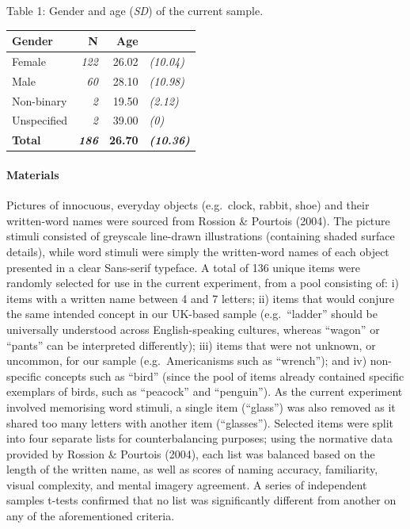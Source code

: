 \documentclass[
  11pt,
]{article}
\begin{document}
Table 1: Gender and age (\emph{SD}) of the current sample.

\begin{table}[!h]
\centering
\begin{tabular}{l>{}rr>{}l}
\toprule
Gender & N & Age & \\
\midrule
Female & \em{122} & 26.02 & \em{(10.04)}\\
Male & \em{60} & 28.10 & \em{(10.98)}\\
Non-binary & \em{2} & 19.50 & \em{(2.12)}\\
Unspecified & \em{2} & 39.00 & \em{(0)}\\
\textbf{Total} & \textbf{\em{186}} & \textbf{26.70} & \textbf{\em{(10.36)}}\\
\bottomrule
\end{tabular}
\end{table}

\hypertarget{materials}{%
\paragraph{Materials}\label{materials}}

Pictures of innocuous, everyday objects (e.g.~clock, rabbit, shoe) and
their written-word names were sourced from Rossion \& Pourtois (2004).
The picture stimuli consisted of greyscale line-drawn illustrations
(containing shaded surface details), while word stimuli were simply the
written-word names of each object presented in a clear Sans-serif
typeface. A total of 136 unique items were randomly selected for use in
the current experiment, from a pool consisting of: i) items with a
written name between 4 and 7 letters; ii) items that would conjure the
same intended concept in our UK-based sample (e.g.~``ladder'' should be
universally understood across English-speaking cultures, whereas
``wagon'' or ``pants'' can be interpreted differently); iii) items that
were not unknown, or uncommon, for our sample (e.g.~Americanisms such as
``wrench''); and iv) non-specific concepts such as ``bird'' (since the
pool of items already contained specific exemplars of birds, such as
``peacock'' and ``penguin''). As the current experiment involved
memorising word stimuli, a single item (``glass'') was also removed as
it shared too many letters with another item (``glasses''). Selected
items were split into four separate lists for counterbalancing purposes;
using the normative data provided by Rossion \& Pourtois (2004), each
list was balanced based on the length of the written name, as well as
scores of naming accuracy, familiarity, visual complexity, and mental
imagery agreement. A series of independent samples t-tests confirmed
that no list was significantly different from another on any of the
aforementioned criteria.
\end{document}
